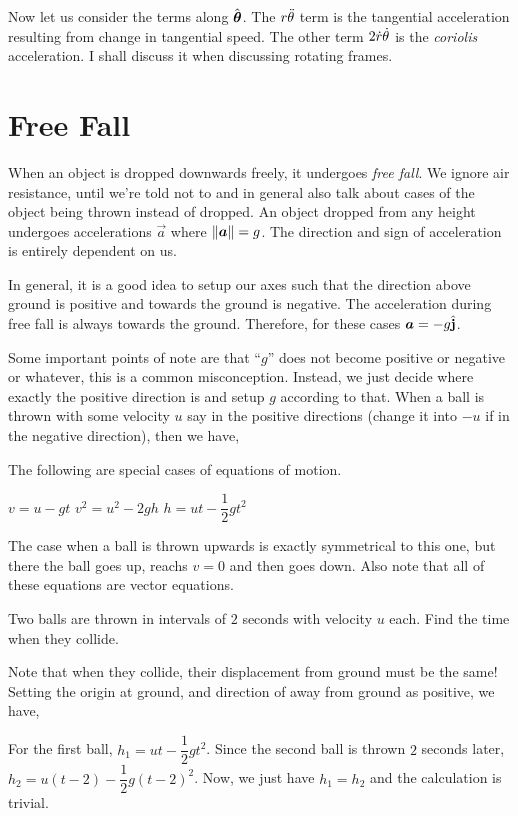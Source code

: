 Now let us consider the terms along \({\hat{\boldsymbol{\mathbf{\theta}}}}\). The \(r\ddot{\theta}\) term is the tangential
acceleration resulting from change in tangential speed. The other term \(2\dot{r}\dot{\theta}\) is the
\emph{coriolis} acceleration. I shall discuss it when discussing rotating frames.

\section{Free Fall}

When an object is dropped downwards freely, it undergoes \emph{free fall}. We ignore
air resistance, until we're told not to and in general also talk about cases of the
object being thrown instead of dropped. An object dropped from any height undergoes
accelerations \(\vec{a}\) where \(\norm{\boldsymbol{a}} = g\). The direction and sign of acceleration
is entirely dependent on us.

In general, it is a good idea to setup our axes such that the direction above ground is positive
and towards the ground is negative. The acceleration during free fall is always towards
the ground. Therefore, for these cases \(\boldsymbol{a} = -g {\hat{\boldsymbol{\mathbf{j}}}}\). 

Some important points of note are that ``\(g\)'' does not become positive or negative or whatever,
this is a common misconception. Instead, we just decide where exactly the positive direction is
and setup \(g\) according to that.
\parbreak
When a ball is thrown with some velocity \(u\) say in the positive directions
(change it into \(-u\) if in the negative direction), then we have,

\begin{algorithm}
    The following are special cases of equations of motion.
    \begin{enumerate}
        \ii \(v = u - gt\)
        \ii \(v^2 = u^2 -2gh\)
        \ii \(h = ut - \dfrac{1}{2}gt^2\)
    \end{enumerate} 
\end{algorithm}

The case when a ball is thrown upwards is exactly symmetrical to this one, but there
the ball goes up, reachs \(v = 0\) and then goes down. Also note that all of these equations are vector
equations.

\begin{example}
    Two balls are thrown in intervals of \(2\) seconds with velocity \(u\) each. Find the
    time when they collide.

    \begin{soln}
        Note that when they collide, their displacement from ground must be the same! Setting 
        the origin at ground, and direction of away from ground as positive, we have,
        
        For the first ball, \(h_{1} = ut - \dfrac{1}{2}gt^2\). Since the second ball
        is thrown \(2\) seconds later, \(h_{2} = u(t-2) - \dfrac{1}{2}g(t-2)^2\). Now, we just have
        \(h_{1} = h_{2}\) and the calculation is trivial.
    \end{soln}
\end{example}

